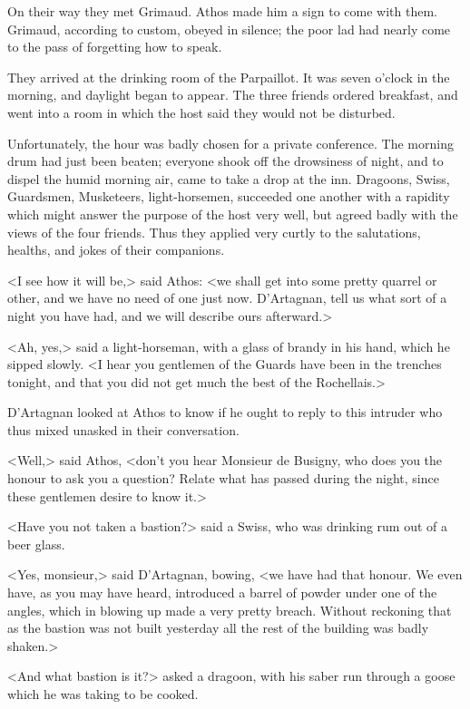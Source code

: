 On their way they met Grimaud. Athos made him a sign to come with them. Grimaud, according to custom, obeyed in silence; the poor lad had nearly come to the pass of forgetting how to speak. 

They arrived at the drinking room of the Parpaillot. It was seven o'clock in the morning, and daylight began to appear. The three friends ordered breakfast, and went into a room in which the host said they would not be disturbed. 

Unfortunately, the hour was badly chosen for a private conference. The morning drum had just been beaten; everyone shook off the drowsiness of night, and to dispel the humid morning air, came to take a drop at the inn. Dragoons, Swiss, Guardsmen, Musketeers, light-horsemen, succeeded one another with a rapidity which might answer the purpose of the host very well, but agreed badly with the views of the four friends. Thus they applied very curtly to the salutations, healths, and jokes of their companions. 

<I see how it will be,> said Athos: <we shall get into some pretty quarrel or other, and we have no need of one just now. D'Artagnan, tell us what sort of a night you have had, and we will describe ours afterward.> 

<Ah, yes,> said a light-horseman, with a glass of brandy in his hand, which he sipped slowly. <I hear you gentlemen of the Guards have been in the trenches tonight, and that you did not get much the best of the Rochellais.> 

D'Artagnan looked at Athos to know if he ought to reply to this intruder who thus mixed unasked in their conversation. 

<Well,> said Athos, <don't you hear Monsieur de Busigny, who does you the honour to ask you a question? Relate what has passed during the night, since these gentlemen desire to know it.> 

<Have you not taken a bastion?> said a Swiss, who was drinking rum out of a beer glass. 

<Yes, monsieur,> said D'Artagnan, bowing, <we have had that honour. We even have, as you may have heard, introduced a barrel of powder under one of the angles, which in blowing up made a very pretty breach. Without reckoning that as the bastion was not built yesterday all the rest of the building was badly shaken.> 

<And what bastion is it?> asked a dragoon, with his saber run through a goose which he was taking to be cooked. 

